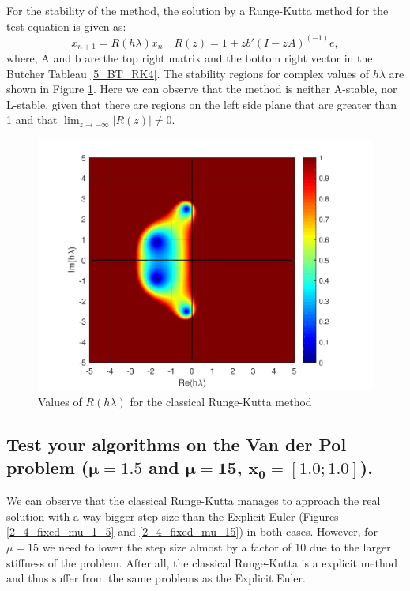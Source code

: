 For the stability of the method, the solution by a Runge-Kutta method for the test equation is given as:
\begin{equation} \label{stability_region_formula}
    x_{n+1} = R(h \lambda) x_n \hspace{1em} R(z) = 1 + z b'(I-zA)^(-1)e,
\end{equation}
where, A and b are the top right matrix and the bottom right vector in the Butcher Tableau \ref{5_BT_RK4}. The stability regions for complex values of $h\lambda$ are shown in Figure \ref{5_3_stability_regions}. Here we can observe that the method is neither A-stable, nor L-stable, given that there are regions on the left side plane that are greater than 1 and that $\lim_{z \to -\infty}|R(z)| \neq 0$.

\begin{figure}[H]
    \centering
    \includegraphics[width=0.7\linewidth]{images/5/5_3_stability_regions.pdf} 
    \caption{Values of $R(h\lambda)$ for the classical Runge-Kutta method}
    \label{5_3_stability_regions}
\end{figure}


\subsection{Test your algorithms on the Van der Pol problem \texorpdfstring{($\mathbf{\mu = 1.5}$ and $\mathbf{\mu = 15}$, $\mathbf{x_0 = [1.0;1.0]}$).}{(mu = 1.5 and mu = 15, x0 = [1.0;1.0]).}}
We can observe that the classical Runge-Kutta manages to approach the real solution with a way bigger step size than the Explicit Euler (Figures \ref{2_4_fixed_mu_1_5} and \ref{2_4_fixed_mu_15}) in both cases. However, for $\mu=15$ we need to lower the step size almost by a factor of 10 due to the larger stiffness of the problem. After all, the classical Runge-Kutta is a explicit method and thus suffer from the same problems as the Explicit Euler.

